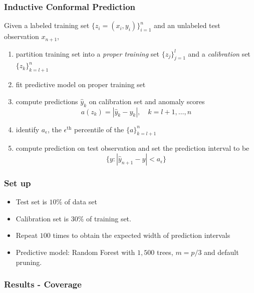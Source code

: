 \documentclass{beamer}
\begin{document}
\begin{frame} \frametitle{Inductive Conformal Prediction}

Given a labeled training set $\{z_i = (x_i, y_i)\}_{i=1}^n$ and an unlabeled test observation $x_{n+1}$,
\begin{enumerate}
	\item partition training set into a \textit{proper training} set $\{z_j\}_{j=1}^l$ and a \textit{calibration} set $\{z_k \}_{k=l+1}^n$
	\item fit predictive model on proper training set
	\item compute predictions $\hat{y}_k$ on calibration set and anomaly scores
	$$a(z_k) = |\hat{y}_k - y_k|, \quad k = l+1, \dots, n$$
	\item identify $a_\epsilon$, the $\epsilon^{\text{th}}$ percentile of the $\{a\}_{k=l+1}^n$
	\item compute prediction on test observation and set the prediction interval to be
	$$\{y: |\hat{y}_{n+1} - y| < a_\epsilon\}$$
	\end{enumerate}
\end{frame}


\begin{frame} \frametitle{Set up}
\begin{itemize}
	\item Test set is $10\%$ of data set
	\item Calibration set is $30\%$ of training set.
	\item Repeat $100$ times to obtain the expected width of prediction intervals	
	\item Predictive model: Random Forest with $1,500$ trees, $m = p/3$ and default pruning.
\end{itemize}
\end{frame}

\begin{frame} \frametitle{Results - Coverage}  

\end{frame}
\end{document}
